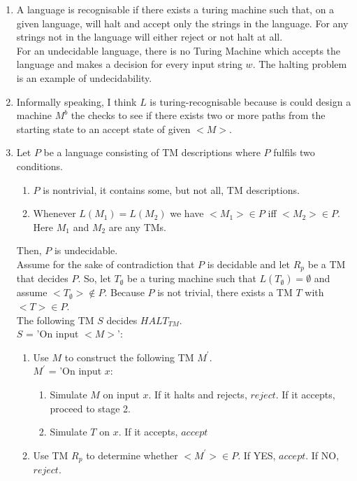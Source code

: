 \documentclass[a4paper,12pt]{article}
\begin{document}
\begin{enumerate}[label=\alph*)]
\item A language is recognisable if there exists a turing machine such that, on a given language, will halt and accept only the strings in the language. For any strings not in the language will either reject or not halt at all. \\
For an undecidable language, there is no Turing Machine which accepts the language and makes a decision for every input string $w$. The halting problem is an example of undecidability.
\item Informally speaking, I think $L$ is turing-recognisable because is could design a machine $M^{b}$ the checks to see if there exists two or more paths from the starting state to an accept state of given $<M>$.
\item Let $P$ be a language consisting of TM descriptions where $P$ fulfils two conditions. \begin{enumerate}[label=\arabic*)]
\item $P$ is nontrivial, it contains some, but not all, TM descriptions.
\item Whenever $L(M_1) = L(M_2)$ we have $<M_1> \in P$ iff $<M_2> \in P$. Here $M_1$ and $M_2$ are any TMs.
\end{enumerate}
Then, $P$ is undecidable. \\
Assume for the sake of contradiction that $P$ is decidable and let $R_p$ be a TM that decides $P$. So, let $T_{\emptyset}$ be a turing machine such that $L(T_{\emptyset})= \emptyset$ and assume $<T_{\emptyset}> \notin P$. Because $P$ is not trivial, there exists a TM $T$ with $<T> \in P$.\\
The following TM $S$ decides $HALT_{TM}$. \\
$S$ = 'On input $<M>$':
\begin{enumerate}[label=\arabic*)]
\item Use $M$ to construct the following TM $M^{'}$. \\ 
$M^{'}$ = 'On input $x$:
\begin{enumerate}[label=\arabic*)]
\item Simulate $M$ on input $x$. If it halts and rejects, $reject$. If it accepts, proceed to stage 2.
\item Simulate $T$ on $x$. If it accepts, $accept$
\end{enumerate}
\item Use TM $R_p$ to determine whether $<M^{'}> \in P$. If YES, $accept$. If NO, $reject$.
\end{enumerate}
\end{enumerate}
\end{document}
